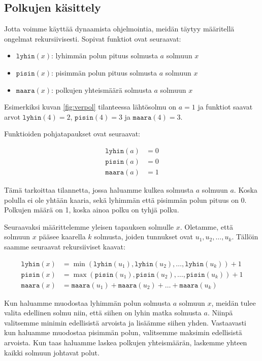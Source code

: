 \subsection{Polkujen käsittely}

Jotta voimme käyttää dynaamista ohjelmointia,
meidän täytyy määritellä ongelmat rekursiivisesti.
Sopivat funktiot ovat seuraavat:

\begin{itemize}
\item $\texttt{lyhin}(x)$: lyhimmän polun pituus solmusta $a$ solmuun $x$
\item $\texttt{pisin}(x)$: pisimmän polun pituus solmusta $a$ solmuun $x$
\item $\texttt{maara}(x)$: polkujen yhteismäärä solmusta $a$ solmuun $x$
\end{itemize}

Esimerkiksi kuvan \ref{fig:verpol} tilanteessa lähtösolmu on $a=1$
ja funktiot saavat arvot $\texttt{lyhin}(4)=2$,
$\texttt{pisin}(4)=3$ ja $\texttt{maara}(4)=3$.

Funktioiden pohjatapaukset ovat seuraavat:

\begin{align*}
\texttt{lyhin}(a)&=0 \\
\texttt{pisin}(a)&=0 \\
\texttt{maara}(a)&=1
\end{align*}

Tämä tarkoittaa tilannetta, jossa haluamme kulkea solmusta $a$
solmuun $a$. Koska polulla ei ole yhtään kaaria,
sekä lyhimmän että pisimmän polun pituus on 0.
Polkujen määrä on 1, koska ainoa polku on tyhjä polku.

Seuraavaksi määrittelemme yleisen tapauksen solmulle $x$.
Oletamme, että solmuun $x$ pääsee kaarella $k$ solmusta,
joiden tunnukset ovat $u_1,u_2,\dots,u_k$.
Tällöin saamme seuraavat rekursiiviset kaavat:

\begin{align*}
\texttt{lyhin}(x)&=\min(\texttt{lyhin}(u_1),\texttt{lyhin}(u_2),\dots,\texttt{lyhin}(u_k))+1 \\
\texttt{pisin}(x)&=\max(\texttt{pisin}(u_1),\texttt{pisin}(u_2),\dots,\texttt{pisin}(u_k))+1 \\
\texttt{maara}(x)&=\texttt{maara}(u_1)+\texttt{maara}(u_2)+\dots+\texttt{maara}(u_k)
\end{align*}

Kun haluamme muodostaa lyhimmän polun solmusta $a$ solmuun $x$,
meidän tulee valita edellinen solmu niin,
että siihen on lyhin matka solmusta $a$.
Niinpä valitsemme minimin edellisistä arvoista
ja lisäämme siihen yhden.
Vastaavasti kun haluamme muodostaa pisimmän polun,
valitsemme maksimin edellisistä arvoista.
Kun taas haluamme laskea polkujen yhteismäärän,
laskemme yhteen kaikki solmuun johtavat polut.

